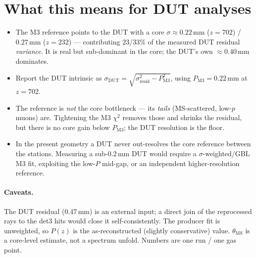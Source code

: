 \documentclass[11pt]{article}
\newcommand{\mm}{\,\mathrm{mm}}
\begin{document}
\section{What this means for DUT analyses}
\begin{itemize}\itemsep2pt
\item The M3 reference points to the DUT with a core $\sigma\approx0.22\mm$ ($z=702$) /
$0.27\mm$ ($z=232$) --- contributing $23$/$33\%$ of the measured DUT residual \emph{variance}.
It is real but sub-dominant in the core; the DUT's own $\approx0.40\mm$ dominates.
\item Report the DUT intrinsic as $\sigma_\mathrm{DUT}=\sqrt{\sigma_\mathrm{resid}^2-P_\mathrm{M3}^2}$,
using $P_\mathrm{M3}=0.22\mm$ at $z=702$.
\item The reference is \emph{not} the core bottleneck --- its \emph{tails} (MS-scattered, low-$p$
muons) are. Tightening the M3 $\chi^2$ removes those and shrinks the residual, but there is no
core gain below $P_\mathrm{M3}$; the DUT resolution is the floor.
\item In the present geometry a DUT never out-resolves the core reference between the stations.
Measuring a sub-$0.2\mm$ DUT would require a $\sigma$-weighted/GBL M3 fit, exploiting the
low-$P$ mid-gap, or an independent higher-resolution reference.
\end{itemize}

\paragraph{Caveats.} The DUT residual ($0.47\mm$) is an external input; a direct join of the
reprocessed rays to the det3 hits would close it self-consistently. The producer fit is
unweighted, so $P(z)$ is the as-reconstructed (slightly conservative) value. $\theta_\mathrm{MS}$
is a core-level estimate, not a spectrum unfold. Numbers are one run / one gas point.
\end{document}
